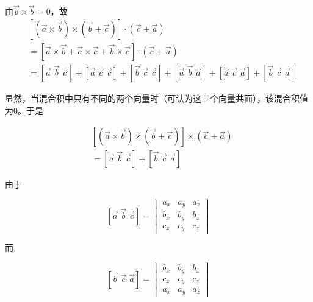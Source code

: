 \documentclass[12pt, a4paper]{article}
\numberwithin{equation}{section}
\begin{document}
    由\(\overrightarrow{b} \times \overrightarrow{b} = 0\)，故
    \\

    \[
        \begin{split}
            & \left[(\overrightarrow{a} \times \overrightarrow{b}) \times (\overrightarrow{b} + \overrightarrow{c})\right] \cdot (\overrightarrow{c} + \overrightarrow{a})
            \\
            &= \left[\overrightarrow{a} \times \overrightarrow{b} + \overrightarrow{a} \times \overrightarrow{c} + \overrightarrow{b} \times \overrightarrow{c}\right]
            \cdot (\overrightarrow{c} + \overrightarrow{a})
            \\
            &= \left[\overrightarrow{a} \; \overrightarrow{b} \; \overrightarrow{c}\right] + \left[\overrightarrow{a} \; \overrightarrow{c} \; \overrightarrow{c}\right] + 
            \left[\overrightarrow{b} \; \overrightarrow{c} \; \overrightarrow{c}\right] + \left[\overrightarrow{a} \; \overrightarrow{b} \; \overrightarrow{a}\right] +
            \left[\overrightarrow{a} \; \overrightarrow{c} \; \overrightarrow{a}\right] + \left[\overrightarrow{b} \; \overrightarrow{c} \; \overrightarrow{a}\right]
        \end{split}
    \]

    显然，当混合积中只有不同的两个向量时（可认为这三个向量共面），该混合积值为0。于是

    \[
        \begin{split}
            & \left[(\overrightarrow{a} \times \overrightarrow{b}) \times (\overrightarrow{b} + \overrightarrow{c})\right] \times (\overrightarrow{c} + \overrightarrow{a})
            \\
            &= \left[\overrightarrow{a} \; \overrightarrow{b} \; \overrightarrow{c}\right] + \left[\overrightarrow{b} \; \overrightarrow{c} \; \overrightarrow{a}\right]
        \end{split}
    \]

    由于

    \[
        \left[\overrightarrow{a} \; \overrightarrow{b} \; \overrightarrow{c}\right] =
        \begin{vmatrix}
        a_{x} & a_{y} & a_{z} \\
        b_{x} & b_{y} & b_{z} \\
        c_{x} & c_{y} & c_{z}
        \end{vmatrix}
    \]

    而

    \[
        \left[\overrightarrow{b} \; \overrightarrow{c} \; \overrightarrow{a}\right] =
        \begin{vmatrix}
        b_{x} & b_{y} & b_{z} \\
        c_{x} & c_{y} & c_{z} \\
        a_{x} & a_{y} & a_{z}
        \end{vmatrix}
    \]
\end{document}
